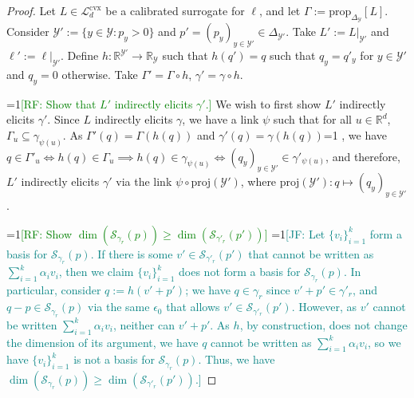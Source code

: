 \documentclass{article} %
\newcommand{\Comments}{0}
\newcommand{\mynote}[2]{\ifnum\Comments=1\textcolor{#1}{#2}\fi}
\newcommand{\mytodo}[2]{\ifnum\Comments=1%
	\todo[linecolor=#1!80!black,backgroundcolor=#1,bordercolor=#1!80!black]{#2}\fi}
\newcommand{\raf}[1]{\mynote{green}{[RF: #1]}}
\newcommand{\jessie}[1]{\mynote{teal}{[JF: #1]}}
\newcommand{\jessiet}[1]{\mytodo{teal!20!white}{JF: #1}}
\newcommand{\reals}{\mathbb{R}}
\newcommand{\simplex}{\Delta_\Y}
\newcommand{\prop}[2][\mathcal{P}]{\mathrm{prop}_{#1}[#2]}
\newcommand{\proj}{\mathrm{proj}}
\newcommand{\Lcvx}{\mathcal{L}^{\mathrm{cvx}}}
\newcommand{\Sc}{\mathcal{S}}  %
\newcommand{\Y}{\mathcal{Y}}
\begin{document}
\hariresult*
\begin{proof}
  Let $L \in \Lcvx_d$ be a calibrated surrogate for $\ell$, and let $\Gamma := \prop[\simplex]{L}$.
  Consider $\Y' := \{y\in\Y : p_y > 0\}$ and $p' = (p_y)_{y\in\Y'} \in \Delta_{\Y'}$.
  Take $L' := L|_{\Y'}$ and $\ell' := \ell|_{\Y'}$.
  Define $h:\reals^{\Y'} \to \reals_\Y$ such that $h(q') = q$ such that $q_y = q'_y$ for $y\in\Y'$ and $q_y = 0$ otherwise.
  Take $\Gamma' = \Gamma \circ h$, $\gamma' = \gamma \circ h$.
  
  \raf{Show that $L'$ indirectly elicits $\gamma'$.}
  We wish to first  show $L'$ indirectly elicits $\gamma'$.
  Since $L$ indirectly elicits $\gamma$, we have a link $\psi$ such that for all $u \in \reals^d$, $\Gamma_u \subseteq \gamma_{\psi(u)}$.
  As $\Gamma'(q) = \Gamma(h(q))$ and $\gamma'(q) = \gamma(h(q))$\jessiet{Hand waving}, we have $q \in \Gamma'_u \iff h(q) \in \Gamma_u \implies h(q) \in \gamma_{\psi(u)} \iff (q_y)_{y \in \Y'} \in \gamma'_{\psi(u)}$, and therefore, $L'$ indirectly elicits $\gamma'$ via the link $\psi \circ \proj(\Y')$, where $\proj(\Y') : q \mapsto (q_y)_{y \in \Y'}$. 

  \raf{Show $\dim(\Sc_{\gamma_r}(p)) \geq \dim(\Sc_{\gamma'_r}(p'))$}
\jessie{  Let $\{v_i\}_{i=1}^k$ form a basis for $\Sc_{\gamma_r}(p)$.
  If there is some $v' \in \Sc_{\gamma'_r}(p')$ that cannot be written as $\sum_{i=1}^k \alpha_i v_i$, then we claim $\{v_i\}_{i=1}^k$ does not form a basis for $\Sc_{\gamma_r}(p)$.
  In particular, consider $q := h(v' + p')$; we have $q \in \gamma_r$ since $v' + p' \in \gamma'_r$, and $q - p \in \Sc_{\gamma_r}(p)$ via the same $\epsilon_0$ that allows $v' \in \Sc_{\gamma'_r}(p')$.
  However, as $v'$ cannot be written $\sum_{i=1}^k \alpha_i v_i$, neither can $v' + p'$.
  As $h$, by construction, does not change the dimension of its argument, we have $q$ cannot be written as $\sum_{i=1}^k \alpha_i v_i$, so we have $\{v_i\}_{i=1}^k$ is not a basis for $\Sc_{\gamma_r}(p)$.
  Thus, we have $\dim(\Sc_{\gamma_r}(p)) \geq \dim(\Sc_{\gamma'_r}(p'))$.}
  

\end{proof}
\end{document}
